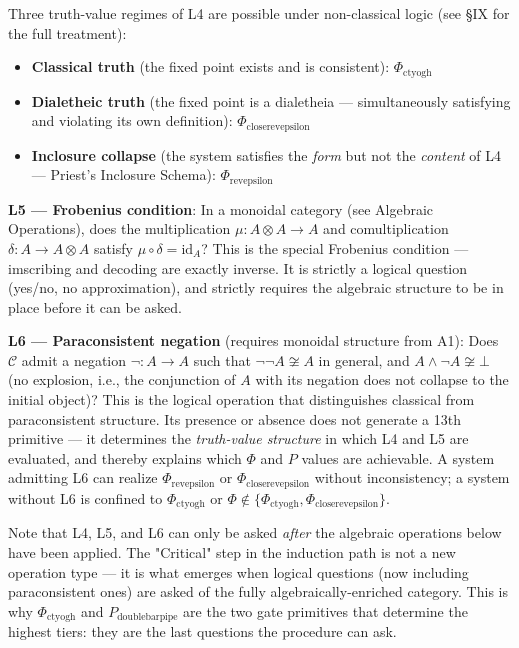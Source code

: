 \documentclass[12pt,a4paper]{article}
\newcommand{\pilcrow}{\S}
\begin{document}
Three truth-value regimes of L4 are possible under non-classical logic (see \pilcrow{}IX for the full treatment):
\begin{itemize}
\item \textbf{Classical truth} (the fixed point exists and is consistent): $\Phi_{\text{ctyogh}}$
\item \textbf{Dialetheic truth} (the fixed point is a dialetheia --- simultaneously satisfying and violating its own definition): $\Phi_{\text{closerevepsilon}}$
\item \textbf{Inclosure collapse} (the system satisfies the \emph{form} but not the \emph{content} of L4 --- Priest's Inclosure Schema): $\Phi_{\text{revepsilon}}$
\end{itemize}

\textbf{L5 --- Frobenius condition}: In a monoidal category (see Algebraic Operations), does the multiplication $\mu: A \otimes A \to A$ and comultiplication $\delta: A \to A \otimes A$ satisfy $\mu \circ \delta = \text{id}_A$? This is the special Frobenius condition --- imscribing and decoding are exactly inverse. It is strictly a logical question (yes/no, no approximation), and strictly requires the algebraic structure to be in place before it can be asked.

\textbf{L6 --- Paraconsistent negation} (requires monoidal structure from A1): Does $\mathcal{C}$ admit a negation $\neg: A \to A$ such that $\neg\neg A \not\cong A$ in general, and $A \wedge \neg A \not\cong \bot$ (no explosion, i.e., the conjunction of $A$ with its negation does not collapse to the initial object)? This is the logical operation that distinguishes classical from paraconsistent structure. Its presence or absence does not generate a 13th primitive --- it determines the \emph{truth-value structure} in which L4 and L5 are evaluated, and thereby explains which $\Phi$ and $P$ values are achievable. A system admitting L6 can realize $\Phi_{\text{revepsilon}}$ or $\Phi_{\text{closerevepsilon}}$ without inconsistency; a system without L6 is confined to $\Phi_{\text{ctyogh}}$ or $\Phi \notin \{\Phi_{\text{ctyogh}}, \Phi_{\text{closerevepsilon}}\}$.

Note that L4, L5, and L6 can only be asked \emph{after} the algebraic operations below have been applied. The "Critical" step in the induction path is not a new operation type --- it is what emerges when logical questions (now including paraconsistent ones) are asked of the fully algebraically-enriched category. This is why $\Phi_{\text{ctyogh}}$ and $P_{\text{doublebarpipe}}$ are the two gate primitives that determine the highest tiers: they are the last questions the procedure can ask.
\end{document}
